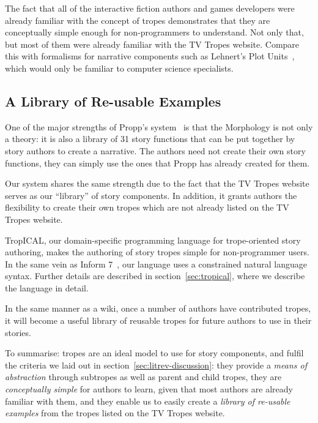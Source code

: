 The fact that all of the interactive fiction authors and games developers were
already familiar with the concept of tropes demonstrates that they are
conceptually simple enough for non-programmers to understand. Not only that, but
most of them were already familiar with the TV Tropes website. Compare this with
formalisms for narrative components such as Lehnert's Plot
Units~\cite{lehnert1981plot}, which would only be familiar to computer science specialists.

\subsection{A Library of Re-usable Examples}

One of the major strengths of Propp's system~\cite{propp1968morphology} is that
the Morphology is not only a theory: it is also a library of 31 story functions
that can be put together by story authors to create a narrative. The authors
need not create their own story functions, they can simply use the ones that
Propp has already created for them.

Our system shares the same strength due to the fact that the TV Tropes website
serves as our ``library'' of story components. In addition, it grants authors
the flexibility to create their own tropes which are not already listed on the
TV Tropes website.

TropICAL, our domain-specific programming language for trope-oriented story
authoring, makes the authoring of story tropes simple for non-programmer users.
In the same vein as Inform 7~\cite{reed2010creating}, our language uses a
constrained natural language syntax. Further details are described in
section~\ref{sec:tropical}, where we describe the language in detail.

In the same manner as a wiki, once a number of authors have contributed tropes,
it will become a useful library of reusable tropes for future authors to use in
their stories.

To summarise: tropes are an ideal model to use for story components, and fulfil
the criteria we laid out in section~\ref{sec:litrev-discussion}: they provide a
\emph{means of abstraction} through subtropes as well as parent and child
tropes, they are \emph{conceptually simple} for authors to learn, given that
most authors are already familiar with them, and they enable us to easily create
a \emph{library of re-usable examples} from the tropes listed on the TV Tropes website.



